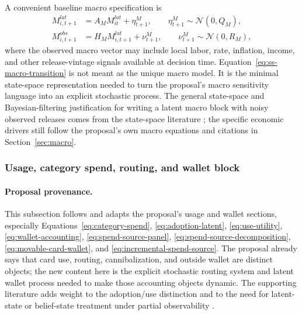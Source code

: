 \documentclass[11pt]{article}
\newcommand{\1}{\mathbf{1}}
\begin{document}
A convenient baseline macro specification is
\begin{align}
  M^{lat}_{i,t+1}
    &= A_M M^{lat}_{it} + \eta^{M}_{t+1},
       \qquad \eta^{M}_{t+1}\sim\mathcal{N}(0,Q_M),
       \label{eq:ss-macro-transition}\\
  M^{obs}_{i,t+1}
    &= H_M M^{lat}_{i,t+1} + \nu^{M}_{t+1},
       \qquad \nu^{M}_{t+1}\sim\mathcal{N}(0,R_M),
       \label{eq:ss-macro-observation}
\end{align}
where the observed macro vector may include local labor, rate, inflation,
income, and other release-vintage signals available at decision time.
Equation~\eqref{eq:ss-macro-transition} is not meant as the unique macro model.
It is the minimal state-space representation needed to turn the proposal's macro
sensitivity language into an explicit stochastic process. The general state-space
and Bayesian-filtering justification for writing a latent macro block with noisy
observed releases comes from the state-space literature
\citep{durbinkoopman2012ssm,westharrison1997bfdm}; the specific economic drivers
still follow the proposal's own macro equations and citations in
Section~\ref{sec:macro}.

\subsubsection{Usage, category spend, routing, and wallet block}
\label{subsec:state-space-usage-wallet}

\paragraph{Proposal provenance.}
This subsection follows and adapts the proposal's usage and wallet sections,
especially Equations~\eqref{eq:category-spend},
\eqref{eq:adoption-latent}, \eqref{eq:use-utility},
\eqref{eq:wallet-accounting}, \eqref{eq:spend-source-panel},
\eqref{eq:spend-source-decomposition}, \eqref{eq:movable-card-wallet}, and
\eqref{eq:incremental-spend-source}. The proposal already says that card use,
routing, cannibalization, and outside wallet are distinct objects; the new
content here is the explicit stochastic routing system and latent wallet process
needed to make those accounting objects dynamic. The supporting literature adds
weight to the adoption/use distinction and to the need for latent-state or
belief-state treatment under partial observability
\citep{koulayev2012payment,agarwal2010rewards,prelec2001creditcard,
smallwood1973pomdp,kaelbling1998pomdp}.
\end{document}
